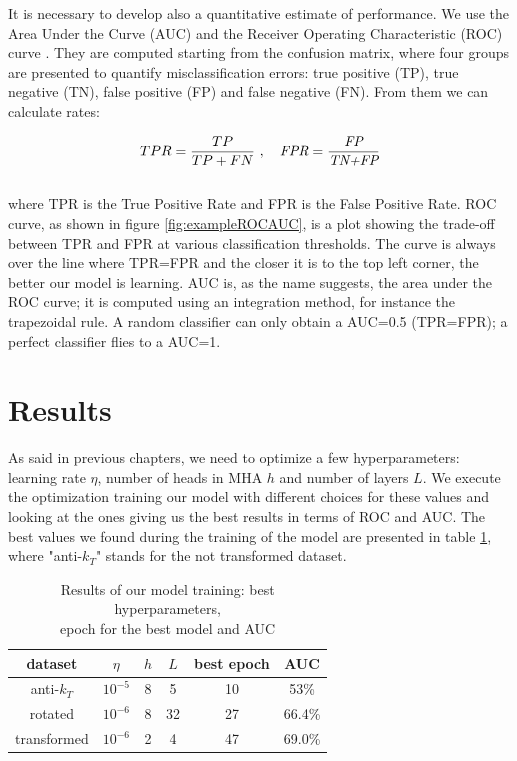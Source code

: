 \noindent It is necessary to develop also a quantitative estimate of performance. We use the Area Under the Curve (AUC) \cite{AUC} and the Receiver Operating Characteristic (ROC) curve \cite{ROC}. They are computed starting from the confusion matrix, where four groups are presented to quantify misclassification errors: true positive (TP), true negative (TN), false positive (FP) and false negative (FN). From them we can calculate rates: 

\begin{equation}
    TPR=\frac{TP}{TP+FN}\ \rm , \ \rm \ \rm \ \rm \textit{FPR}=\frac{\textit{FP}}{\textit{TN+FP}}
\end{equation}
\\
\noindent where TPR is the True Positive Rate and FPR is the False Positive Rate. ROC curve, as shown in figure \ref{fig:exampleROCAUC}, is a plot showing the trade-off between TPR and FPR at various classification thresholds. The curve is always over the line where TPR=FPR and the closer it is to the top left corner, the better our model is learning. AUC is, as the name suggests, the area under the ROC curve; it is computed using an integration method, for instance the trapezoidal rule. A random classifier can only obtain a AUC=0.5 (TPR=FPR); a perfect classifier flies to a AUC=1.

\section{Results}\label{sec:results}

As said in previous chapters, we need to optimize a few hyperparameters: learning rate $\eta$, number of heads in MHA $h$ and number of layers $L$. We execute the optimization training our model with different choices for these values and looking at the ones giving us the best results in terms of ROC and AUC. The best values we found during the training of the model are presented in table \ref{tab:results}, where "anti-$k_T$" stands for the not transformed dataset. 

\begin{table}[h!]
    \centering
    \begin{tabular}{|c||c|c|c||c|c|}
         \hline
         \rowcolor{lightgray}
         dataset & $\eta$ & $h$ & $L$ & best epoch & AUC\\
         \hline\hline
        anti-$k_T$ & $10^{-5}$ & 8  & 5 & 10 & 53\%\\
         \hline
        rotated & $10^{-6}$ &  8 & 32 & 27 & 66.4\% \\
         \hline
        transformed & $10^{-6}$ & 2 & 4 & 47 & 69.0\% \\
         \hline
    \end{tabular}
    \caption{\centering Results of our model training: best hyperparameters,\\ epoch for the best model and AUC}
    \label{tab:results}
\end{table}

